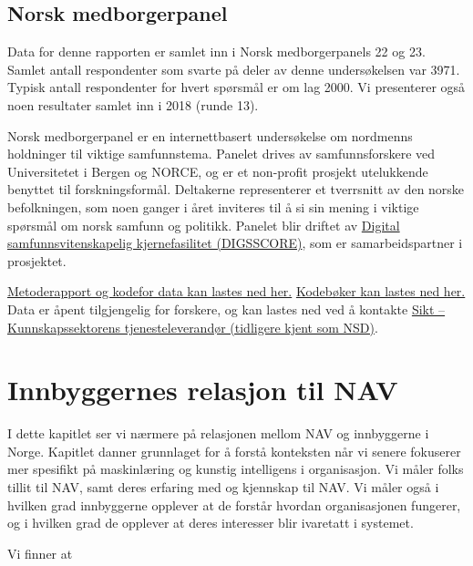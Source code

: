 \documentclass[
  12pt,
  a4paper, 12pt]{article}
\begin{document}
\hypertarget{norsk-medborgerpanel}{%
\subsection{Norsk medborgerpanel}\label{norsk-medborgerpanel}}

Data for denne rapporten er samlet inn i Norsk medborgerpanels 22 og 23.
Samlet antall respondenter som svarte på deler av denne undersøkelsen var 3971.
Typisk antall respondenter for hvert spørsmål er om lag 2000.
Vi presenterer også noen resultater samlet inn i 2018 (runde 13).

Norsk medborgerpanel er en internettbasert undersøkelse om nordmenns holdninger til viktige samfunnstema.
Panelet drives av samfunnsforskere ved Universitetet i Bergen og NORCE, og er et non-profit prosjekt utelukkende benyttet til forskningsformål.
Deltakerne representerer et tverrsnitt av den norske befolkningen, som noen ganger i året inviteres til å si sin mening i viktige spørsmål om norsk samfunn og politikk.
Panelet blir driftet av \href{www.digsscore.uib.no}{Digital samfunnsvitenskapelig kjernefasilitet (DIGSSCORE)}, som er samarbeidspartner i prosjektet.

\href{https://www.uib.no/en/digsscore/122162/methodology-and-field-periods}{Metoderapport og kodefor data kan lastes ned her.}
\href{https://www.uib.no/medborger/76892/data-og-dokumentasjon}{Kodebøker kan lastes ned her.}
Data er åpent tilgjengelig for forskere, og kan lastes ned ved å kontakte \href{https://sikt.no/}{Sikt -- Kunnskapssektorens tjenesteleverandør (tidligere kjent som NSD)}.

\newpage

\hypertarget{nav}{%
\section{Innbyggernes relasjon til NAV}\label{nav}}

I dette kapitlet ser vi nærmere på relasjonen mellom NAV og innbyggerne i Norge.
Kapitlet danner grunnlaget for å forstå konteksten når vi senere fokuserer mer spesifikt på maskinlæring og kunstig intelligens i organisasjon.
Vi måler folks tillit til NAV, samt deres erfaring med og kjennskap til NAV.
Vi måler også i hvilken grad innbyggerne opplever at de forstår hvordan organisasjonen fungerer, og i hvilken grad de opplever at deres interesser blir ivaretatt i systemet.

Vi finner at
\end{document}
